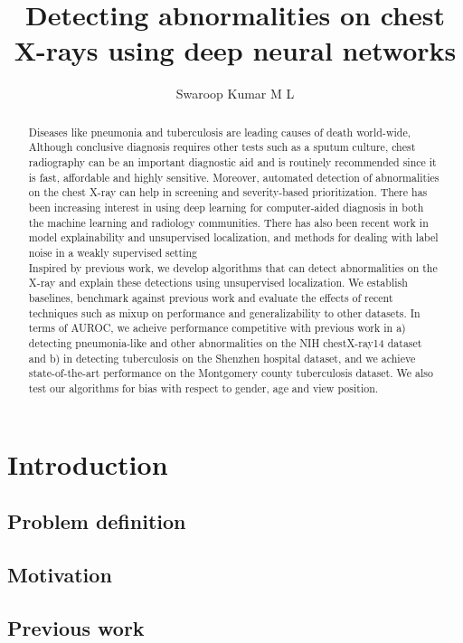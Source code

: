 \documentclass[11pt,twoside,a4paper]{report}
\title{Detecting abnormalities on chest X-rays using deep neural networks}
\author{Swaroop Kumar M L}
\begin{document}
\maketitle
\begin{abstract}
    Diseases like pneumonia and tuberculosis are leading causes of death world-wide,
    Although conclusive diagnosis requires other tests such as a sputum culture,
    chest radiography can be an important diagnostic aid and is routinely recommended
    since it is fast, affordable and highly sensitive. Moreover, automated detection of
    abnormalities on the chest X-ray can help in screening and severity-based prioritization.
    There has been increasing interest in using deep learning for computer-aided diagnosis in both the
    machine learning and radiology communities. There has also been recent work in model explainability and
    unsupervised localization, and methods for dealing with label noise in a weakly supervised setting\\

    Inspired by previous work, we develop algorithms that
    can detect abnormalities on the X-ray and explain these detections using unsupervised localization.
    We establish baselines, benchmark against previous work and evaluate the effects of recent techniques
    such as mixup on performance and generalizability to other datasets.
    In terms of AUROC, we acheive performance competitive with previous work in a) detecting pneumonia-like
    and other abnormalities on the NIH chestX-ray14 dataset and b) in detecting tuberculosis on the Shenzhen
    hospital dataset, and we achieve state-of-the-art performance on the Montgomery county tuberculosis dataset.
    We also test our algorithms for bias with respect to gender, age and view position. 
\end{abstract}
\tableofcontents
\chapter{Introduction}
    \section{Problem definition}
    \section{Motivation}
    \section{Previous work}
\end{document}
